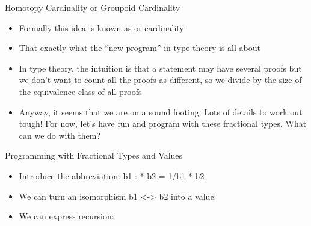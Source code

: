 \documentclass[11pt]{beamer}
\newcommand{\red}[1]{{\color{red}{#1}}}
\begin{document}
\begin{frame}{Homotopy Cardinality or Groupoid Cardinality}

\begin{itemize}
\vfill\item Formally this idea is known as \red{homotopy cardinality} or
  \red{groupoid} cardinality

\vfill\item That exactly what the ``new program'' in type theory is all
  about

\vfill\item In type theory, the intuition is that a statement may have
  several proofs but we don't want to count all the proofs as different, so 
  we divide by the size of the equivalence class of all proofs

  \vfill\item Anyway, it seems that we are on a sound footing. Lots of
  details to work out tough! For now, let's have fun and program with these
  fractional types. What can we do with them?

\end{itemize}

\end{frame}

\begin{frame}{Programming with Fractional Types and Values}

\begin{itemize}
\vfill\item Introduce the abbreviation: {{ b1 :-* b2 = 1/b1 * b2}}

\vfill\item We can turn an isomorphism {{b1 <-> b2}} into a value:


\vfill\item We can express recursion:


\end{itemize}

\vfill

\end{frame}
\end{document}
